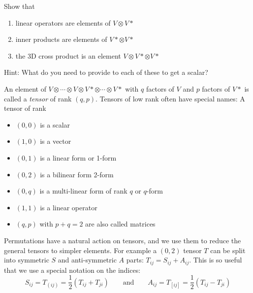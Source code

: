 \begin{exercise}
Show that 
\begin{enumerate}
\item linear operators are elements of $V ⊗ V*$
\item inner products are elements of $V* ⊗ V*$
\item the 3D cross product is an element $V ⊗ V* ⊗ V*$
\end{enumerate}
Hint: What do you need to provide to each of these to get a scalar?
\end{exercise}

An element of $V ⊗ \cdots ⊗ V ⊗ V* ⊗ \cdots ⊗ V*$ with $q$ factors of $V$ and $p$ factors of $V*$ is called a {\em tensor} of rank $(q,p)$. Tensors of low rank often have special names: A tensor of rank
\begin{itemize}
\item $(0,0)$ is a scalar
\item $(1,0)$ is a vector
\item $(0,1)$ is a linear form or 1-form
\item $(0,2)$ is a bilinear form 2-form
\item $(0,q)$ is a multi-linear form of rank $q$ or $q$-form
\item $(1,1)$ is a linear operator
\item $(q,p)$ with $p+q=2$ are also called matrices
\end{itemize}

Permutations have a natural action on tensors, and we use them to reduce the general tensors to simpler elements. For example a $(0,2)$ tensor $T$ can be split into symmetric $S$ and anti-symmetric $A$ parts: $T_{ij} = S_{ij} + A_{ij}$. This is so useful that we use a special notation on the indices:
$$
S_{ij} = T_{(ij)} = \frac12 (T_{ij} + T_{ji})
\quad \quad \textrm{and}\quad \quad 
A_{ij} = T_{[ij]} = \frac12 (T_{ij} - T_{ji})
$$

